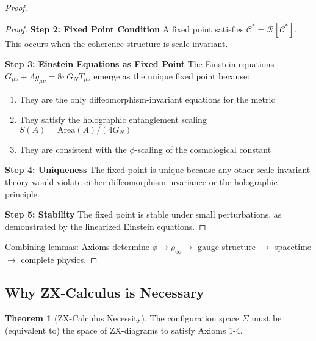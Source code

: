 \documentclass[11pt]{article}
\theoremstyle{definition}
\newtheorem{theorem}{Theorem}[section]
\newcommand{\goldenratio}{\phi}
\newcommand{\coherence}{\mathcal{C}}
\newcommand{\configspace}{\Sigma}
\newcommand{\density}{\rho}
\begin{document}
\begin{proof}
\begin{proof}
\textbf{Step 2: Fixed Point Condition}
A fixed point satisfies $\coherence^* = \mathcal{R}[\coherence^*]$. This occurs when the coherence structure is scale-invariant.

\textbf{Step 3: Einstein Equations as Fixed Point}
The Einstein equations $G_{\mu\nu} + \Lambda g_{\mu\nu} = 8\pi G_N T_{\mu\nu}$ emerge as the unique fixed point because:
\begin{enumerate}
\item They are the only diffeomorphism-invariant equations for the metric
\item They satisfy the holographic entanglement scaling $S(A) = \text{Area}(A)/(4G_N)$
\item They are consistent with the $\goldenratio$-scaling of the cosmological constant
\end{enumerate}

\textbf{Step 4: Uniqueness}
The fixed point is unique because any other scale-invariant theory would violate either diffeomorphism invariance or the holographic principle.

\textbf{Step 5: Stability}
The fixed point is stable under small perturbations, as demonstrated by the linearized Einstein equations.
\end{proof}

Combining lemmas: Axioms determine $\goldenratio \to \density_\infty \to$ gauge structure $\to$ spacetime $\to$ complete physics.
\end{proof}

\subsection{Why ZX-Calculus is Necessary}

\begin{theorem}[ZX-Calculus Necessity]
The configuration space $\configspace$ must be (equivalent to) the space of ZX-diagrams to satisfy Axioms 1-4.
\end{theorem}
\end{document}
